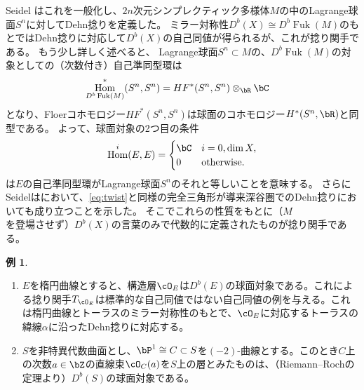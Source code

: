 \documentclass[uplatex,11pt,a4paper,dvipdfmx]{jsarticle}
\numberwithin{equation}{section}
\theoremstyle{definition}
\newtheorem{example}[theorem]{例}
\DeclareMathOperator{\Hom}{\mathrm{Hom}}
\DeclareMathOperator{\Fuk}{Fuk}
\begin{document}
Seidel \cite{MR1743463}はこれを一般化し、$2n$次元シンプレクティック多様体$M$の中のLagrange球面$S^n$に対してDehn捻りを定義した。
ミラー対称性$D^b(X) \cong D^b \Fuk(M)$のもとではDehn捻りに対応して$D^b(X)$の自己同値が得られるが、これが捻り関手である。
もう少し詳しく述べると、
Lagrange球面$S^n \subset M$の、$D^b\Fuk(M)$の対象としての（次数付き）自己準同型環は
\begin{align}
    \Hom_{D^b\Fuk(M)}^*(S^n, S^n) & = HF^*(S^n, S^n)\otimes_\bR \bC
\end{align}
となり、Floerコホモロジー$HF^*(S^n, S^n)$は球面のコホモロジー$H^*(S^n, \bR)$と同型である。
よって、球面対象の2つ目の条件$$\Hom^i(E, E) = \begin{cases}
        \bC & i = 0, \dim X,    \\
        0   & \text{otherwise.}
    \end{cases}$$は$E$の自己準同型環がLagrange球面$S^n$のそれと等しいことを意味する。
さらにSeidelは\cite{MR1978046}において、\eqref{eq:twist}と同様の完全三角形が導来深谷圏でのDehn捻りにおいても成り立つことを示した。
そこでこれらの性質をもとに（$M$を登場させず）$D^b(X)$の言葉のみで代数的に定義されたものが捻り関手である。
\begin{example}
    \begin{enumerate}
        \item $E$を楕円曲線とすると、構造層$\cO_E$は$D^b(E)$の球面対象である。これによる捻り関手$T_{\cO_E}$は標準的な自己同値ではない自己同値の例を与える。これは楕円曲線とトーラスのミラー対称性のもとで、$\cO_E$に対応するトーラスの緯線$\alpha$に沿ったDehn捻りに対応する。
        \item $S$を非特異代数曲面とし、$\bP^1 \cong C \subset S$を$(-2)$-曲線とする。このとき$C$上の次数$a \in \bZ$の直線束$\cO_C(a)$を$S$上の層とみたものは、（Riemann--Rochの定理より）$D^b(S)$の球面対象である。
    \end{enumerate}
\end{example}
\end{document}
